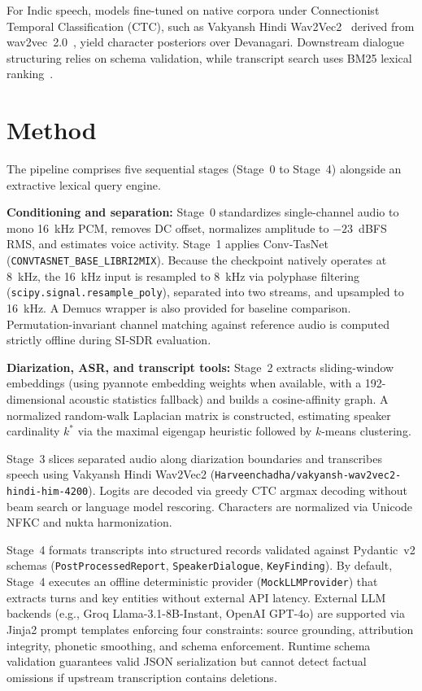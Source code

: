 \documentclass[11pt,a4paper,twocolumn]{article}
\begin{document}
For Indic speech, models fine-tuned on native corpora under Connectionist Temporal Classification (CTC), such as Vakyansh Hindi Wav2Vec2~\cite{chadha2021vakyansh} derived from wav2vec~2.0~\cite{baevski2020wav2vec}, yield character posteriors over Devanagari. Downstream dialogue structuring relies on schema validation, while transcript search uses BM25 lexical ranking~\cite{robertson2009bm25}.

\section{Method}
The pipeline comprises five sequential stages (Stage~0 to Stage~4) alongside an extractive lexical query engine.

\noindent\textbf{Conditioning and separation:} Stage~0 standardizes single-channel audio to mono 16~kHz PCM, removes DC offset, normalizes amplitude to $-23$~dBFS RMS, and estimates voice activity. Stage~1 applies Conv-TasNet (\texttt{CONVTASNET\_BASE\_LIBRI2MIX}). Because the checkpoint natively operates at 8~kHz, the 16~kHz input is resampled to 8~kHz via polyphase filtering (\texttt{scipy.signal.resample\_poly}), separated into two streams, and upsampled to 16~kHz. A Demucs wrapper is also provided for baseline comparison. Permutation-invariant channel matching against reference audio is computed strictly offline during SI-SDR evaluation.

\noindent\textbf{Diarization, ASR, and transcript tools:} Stage~2 extracts sliding-window embeddings (using pyannote embedding weights when available, with a 192-dimensional acoustic statistics fallback) and builds a cosine-affinity graph. A normalized random-walk Laplacian matrix is constructed, estimating speaker cardinality $k^*$ via the maximal eigengap heuristic followed by $k$-means clustering.

Stage~3 slices separated audio along diarization boundaries and transcribes speech using Vakyansh Hindi Wav2Vec2 (\texttt{Harveenchadha/}\allowbreak\texttt{vakyansh-wav2vec2-hindi-him-4200}). Logits are decoded via greedy CTC argmax decoding without beam search or language model rescoring. Characters are normalized via Unicode NFKC and nukta harmonization.

Stage~4 formats transcripts into structured records validated against Pydantic~v2 schemas (\texttt{PostProcessedReport}, \texttt{SpeakerDialogue}, \texttt{KeyFinding}). By default, Stage~4 executes an offline deterministic provider (\texttt{MockLLMProvider}) that extracts turns and key entities without external API latency. External LLM backends (e.g., Groq Llama-3.1-8B-Instant, OpenAI GPT-4o) are supported via Jinja2 prompt templates enforcing four constraints: source grounding, attribution integrity, phonetic smoothing, and schema enforcement. Runtime schema validation guarantees valid JSON serialization but cannot detect factual omissions if upstream transcription contains deletions.
\end{document}
